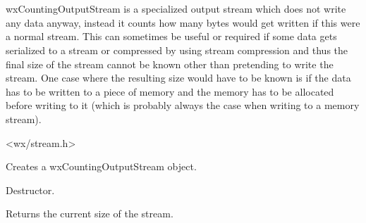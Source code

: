 \section{}\label{wxcountingoutputstream}

wxCountingOutputStream is a specialized output stream which does not write any data anyway,
instead it counts how many bytes would get written if this were a normal stream. This
can sometimes be useful or required if some data gets serialized to a stream or compressed
by using stream compression and thus the final size of the stream cannot be known other
than pretending to write the stream. One case where the resulting size would have to be
known is if the data has to be written to a piece of memory and the memory has to be
allocated before writing to it (which is probably always the case when writing to a 
memory stream).




<wx/stream.h>


\label{wxcountingoutputstreamctor}


Creates a wxCountingOutputStream object.

\label{wxcountingoutputstreamdtor}


Destructor.

\label{wxcountingoutputstreamgetsize}


Returns the current size of the stream.

